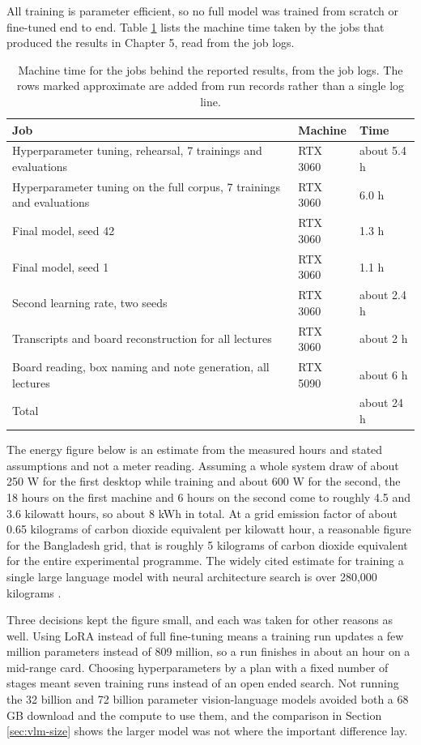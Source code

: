 All training is parameter efficient, so no full model was trained from scratch or
fine-tuned end to end. Table \ref{tab:compute} lists the machine time taken by the jobs
that produced the results in Chapter 5, read from the job logs.

\begin{table}[htbp]
\centering
\caption[Machine time for the jobs behind the reported results]{Machine time for the jobs behind the reported results, from the job logs. The
rows marked approximate are added from run records rather than a single log line.}
\label{tab:compute}
\small
\begin{tabular}{p{7.6cm}p{2.4cm}p{3.2cm}}
\toprule
Job & Machine & Time \\
\midrule
Hyperparameter tuning, rehearsal, 7 trainings and evaluations & RTX 3060 &
about 5.4 h \\
Hyperparameter tuning on the full corpus, 7 trainings and evaluations & RTX 3060 & 6.0 h \\
Final model, seed 42 & RTX 3060 & 1.3 h \\
Final model, seed 1 & RTX 3060 & 1.1 h \\
Second learning rate, two seeds & RTX 3060 & about 2.4 h \\
Transcripts and board reconstruction for all lectures & RTX 3060 & about 2 h \\
Board reading, box naming and note generation, all lectures & RTX 5090 & about 6 h \\
\midrule
Total & & about 24 h \\
\bottomrule
\end{tabular}
\end{table}

The energy figure below is an estimate from the measured hours and stated assumptions
and not a meter reading. Assuming a whole system draw of about 250 W for the first
desktop while training and about 600 W for the second, the 18 hours on the first machine
and 6 hours on the second come to roughly 4.5 and 3.6 kilowatt hours, so about 8 kWh in
total. At a grid emission factor of about 0.65 kilograms of carbon dioxide equivalent per
kilowatt hour, a reasonable figure for the Bangladesh grid, that is roughly 5 kilograms
of carbon dioxide equivalent for the entire experimental programme. The widely cited
estimate for training a single large language model with neural architecture search is
over 280,000 kilograms \cite{strubell2019energy}.

Three decisions kept the figure small, and each was taken for other reasons as well.
Using LoRA instead of full fine-tuning means a training run updates a few million
parameters instead of 809 million, so a run finishes in about an hour on a mid-range
card. Choosing hyperparameters by a plan with a fixed number of stages meant seven
training runs instead of an open ended search. Not running the 32 billion and 72 billion
parameter vision-language models avoided both a 68 GB download and the compute to use
them, and the comparison in Section \ref{sec:vlm-size} shows the larger model was not where the
important difference lay.

